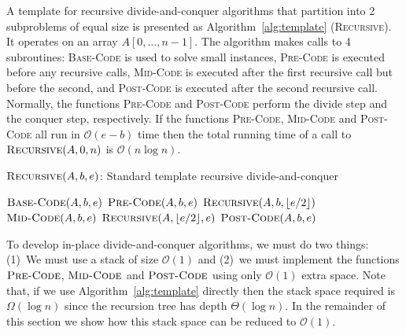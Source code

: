 \documentclass{elsart}
\newcommand{\Oh}[1]{\ensuremath{\mathcal{O}(#1)}}
\begin{document}
A template for recursive divide-and-conquer algorithms that partition
into 2 subproblems of equal size is presented as
Algorithm~\ref{alg:template} (\textsc{Recursive}). It operates on an
array $A[0,\ldots,n-1]$.  The algorithm makes calls to 4 subroutines:
\textsc{Base-Code} is used to solve small instances, \textsc{Pre-Code}
is executed before any recursive calls, \textsc{Mid-Code} is executed
after the first recursive call but before the second, and
\textsc{Post-Code} is executed after the second recursive call.
Normally, the functions \textsc{Pre-Code} and \textsc{Post-Code}
perform the divide step and the conquer step, respectively.  If the
functions \textsc{Pre-Code}, \textsc{Mid-Code} and \textsc{Post-Code}
all run in $\Oh{e-b}$ time then the total running time of a call to
$\textsc{Recursive}(A,0,n)$ is \Oh{n\log n}.

\begin{algorithm}
  \caption{$\textsc{Recursive}(A,b,e)$: Standard template recursive
    divide-and-conquer}
  \label{alg:recurse}
  \label{alg:template}
  \begin{algorithmic}[1]
    \STATE $\textsc{Base-Code}(A,b,e)$ 
    \ELSE
    \STATE $\textsc{Pre-Code}(A,b,e)$ 
    \STATE $\textsc{Recursive}(A,b,\lfloor e/2 \rfloor)$ 
    \STATE $\textsc{Mid-Code}(A,b,e)$ 
    \STATE $\textsc{Recursive}(A,\lfloor e/2 \rfloor,e)$
    \STATE $\textsc{Post-Code}(A,b,e)$ 
    \ENDIF
  \end{algorithmic}
\end{algorithm}

To develop in-place divide-and-conquer algorithms, we must do two
things:  (1)~We must use a stack of size $\Oh{1}$ and (2)~we must
implement the functions $\textsc{Pre-Code}$, $\textsc{Mid-Code}$ and
$\textsc{Post-Code}$ using only $\Oh{1}$ extra space.  Note that, if we
use Algorithm~\ref{alg:template} directly then the stack space
required is $\Omega(\log n)$ since the recursion tree has depth
$\Theta(\log n)$.  In the remainder of this section we show how this
stack space can be reduced to $\Oh{1}$.
\end{document}
